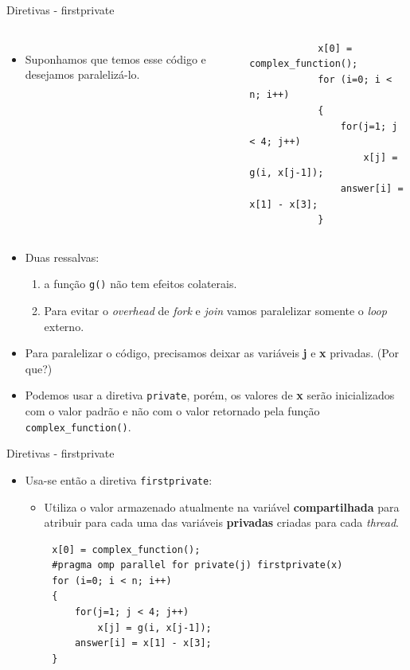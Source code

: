 \begin{frame}[fragile]{Diretivas - firstprivate}
	\begin{columns}
		\begin{itemize}
			\item Suponhamos que temos esse código e desejamos paralelizá-lo.
		\end{itemize}
		\begin{verbatim}
			x[0] = complex_function();
			for (i=0; i < n; i++)
			{
				for(j=1; j < 4; j++)
					x[j] = g(i, x[j-1]);
				answer[i] = x[1] - x[3];
			}
		\end{verbatim}
	\end{columns}
	\pause
	\begin{itemize}
		\item Duas ressalvas:
		\smallskip
		\begin{enumerate}
			\item a função \texttt{g()} não tem efeitos colaterais.
			\smallskip
			\item Para evitar o \textit{overhead} de \textit{fork} e \textit{join} vamos paralelizar somente o \textit{loop} externo.
		\end{enumerate}
		\pause
		\item Para paralelizar o código, precisamos deixar as variáveis \textbf{j} e \textbf{x} privadas. ({\color{bostonuniversityred}Por que?})
		\pause
		\smallskip
		\item Podemos usar a diretiva \texttt{private}, porém, os valores de \textbf{x} serão inicializados com o valor padrão e não com o valor retornado pela função \texttt{complex\_function()}.
	\end{itemize}
\end{frame}

\begin{frame}[fragile]{Diretivas - firstprivate}
	\begin{itemize}
		\item Usa-se então a diretiva \texttt{firstprivate}:
		\medskip
		\begin{itemize}
			\item Utiliza o valor armazenado atualmente na variável \textbf{compartilhada} para atribuir para cada uma das variáveis \textbf{privadas} criadas para cada \textit{thread}.
		\end{itemize}
	\end{itemize}
	\begin{verbatim}
		x[0] = complex_function();
		#pragma omp parallel for private(j) firstprivate(x)
		for (i=0; i < n; i++)
		{
			for(j=1; j < 4; j++)
				x[j] = g(i, x[j-1]);
			answer[i] = x[1] - x[3];
		}
	\end{verbatim}
\end{frame}

